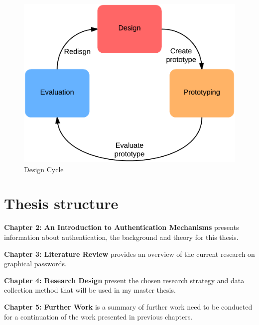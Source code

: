     \begin{figure}[H]
      \centering
      \includegraphics[scale=0.25]{pics/DesignCycle.png}
      \caption[Design Cycle \cite{Norman}]{Design Cycle}
      \label{fig:cycle}
    \end{figure}

  \section{Thesis structure} \label{sec:structure}

    {\bf Chapter 2: An Introduction to Authentication Mechanisms} presents information about authentication, the background and theory for this thesis. 

    {\bf Chapter 3: Literature Review} provides an overview of the current research on graphical passwords. 

    {\bf Chapter 4: Research Design} present the chosen research strategy and data collection method that will be used in my master thesis. 

    {\bf Chapter 5: Further Work} is a summary of further work need to be conducted for a continuation of the work presented in previous chapters.   


